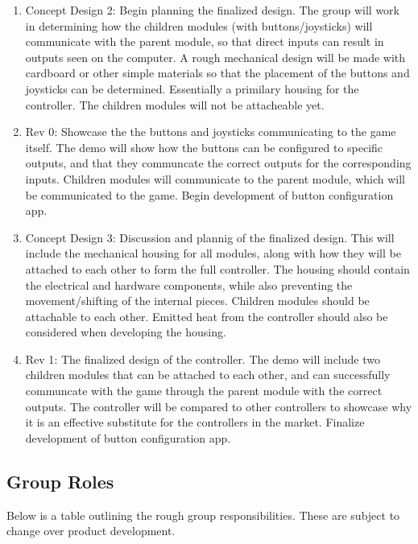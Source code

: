 \documentclass[a4]{article}
\begin{document}
\begin{enumerate}
    \item \textcolor{McMasterMaroon}{Concept Design 2}: Begin planning the finalized design. The group will work in determining how the children modules (with buttons/joysticks) will communicate with the parent module, so that direct inputs can result in outputs seen on the computer. A rough mechanical design will be made with cardboard or other simple materials so that the placement of the buttons and joysticks can be determined. Essentially a primilary housing for the controller. The children modules will not be attacheable yet.
    \item \textcolor{McMasterMaroon}{Rev 0}: Showcase the the buttons and joysticks communicating to the game itself. The demo will show how the buttons can be configured to specific outputs, and that they communcate the correct outputs for the corresponding inputs. Children modules will communicate to the parent module, which will be communicated to the game. Begin development of button configuration app.
    \item \textcolor{McMasterMaroon}{Concept Design 3}: Discussion and plannig of the finalized design. This will include the mechanical housing for all modules, along with how they will be attached to each other to form the full controller. The housing should contain the electrical and hardware components, while also preventing the movement/shifting of the internal pieces. Children modules should be attachable to each other. Emitted heat from the controller should also be considered when developing the housing.
    \item \textcolor{McMasterMaroon}{Rev 1}: The finalized design of the controller. The demo will include two children modules that can be attached to each other, and can successfully communcate with the game through the parent module with the correct outputs. The controller will be compared to other controllers to showcase why it is an effective substitute for the controllers in the market. Finalize development of button configuration app.
\end{enumerate}

\clearpage
\subsection{Group Roles}

Below is a table outlining the rough group responsibilities. These are subject to change over product development.
\end{document}

